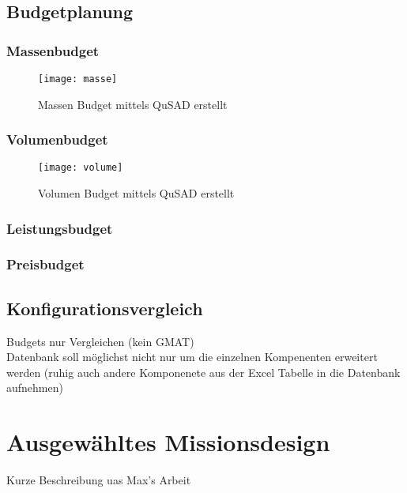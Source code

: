 				\subsection{Budgetplanung}
				
						\subsubsection{Massenbudget}
								
										\begin{figure}[h]
											\centering
												\texttt{[image: masse]}
											\caption{Massen Budget mittels QuSAD erstellt}
											\label{fig:masse}
										\end{figure}
										
						\subsubsection{Volumenbudget}
								
										\begin{figure}[h]
											\centering
												\texttt{[image: volume]}
											\caption{Volumen Budget mittels QuSAD erstellt }
											\label{fig:volume}
										\end{figure}
								
						\subsubsection{Leistungsbudget}
						\subsubsection{Preisbudget}
				
				\subsection{Konfigurationsvergleich}
		Budgets nur Vergleichen (kein GMAT) \\
		Datenbank soll möglichst nicht nur um die einzelnen Kompenenten erweitert werden (ruhig auch andere Komponenete aus der Excel Tabelle in die Datenbank aufnehmen)
		
		\section{	Ausgewähltes Missionsdesign}
		Kurze Beschreibung uas Max's Arbeit
				
